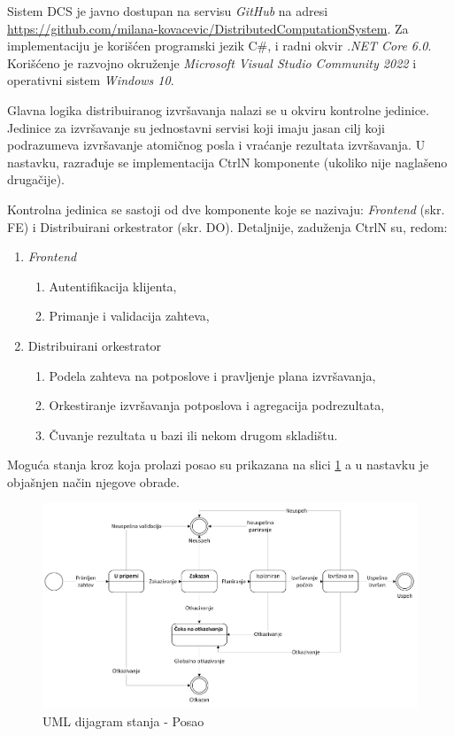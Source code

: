 \documentclass[12pt,oneside]{memoir}
\begin{document}
Sistem DCS je javno dostupan na servisu \emph{GitHub} na adresi \href{https://github.com/milana-kovacevic/DistributedComputationSystem}{https://github.com/milana-kovacevic/DistributedComputationSystem}\label{githubdsc}. Za implementaciju je korišćen programski jezik C\#, i radni okvir \emph{.NET Core 6.0}. Korišćeno je razvojno okruženje \emph{Microsoft Visual Studio Community 2022} i operativni sistem \emph{Windows 10}.

Glavna logika distribuiranog izvršavanja nalazi se u okviru kontrolne jedinice. Jedinice za izvršavanje su jednostavni servisi koji imaju jasan cilj koji podrazumeva izvršavanje atomičnog posla i vraćanje rezultata izvršavanja. U nastavku, razrađuje se implementacija CtrlN komponente (ukoliko nije naglašeno drugačije).

Kontrolna jedinica se sastoji od dve komponente koje se nazivaju: \emph{Frontend} (skr. FE) i Distribuirani orkestrator (skr. DO). Detaljnije, zaduženja CtrlN su, redom:
\begin{enumerate}
\item \emph{Frontend}
	\begin{enumerate}
	\item Autentifikacija klijenta,
	\item Primanje i validacija zahteva,
	\end{enumerate}
\item Distribuirani orkestrator
	\begin{enumerate}
	\item \label{podela_planiranje}Podela zahteva na potposlove i pravljenje plana izvršavanja,
	\item \label{orkestriranje}Orkestiranje izvršavanja potposlova i agregacija podrezultata,
	\item \label{cuvanje_u_bazi}Čuvanje rezultata u bazi ili nekom drugom skladištu.
	\end{enumerate}
\end{enumerate}

Moguća stanja kroz koja prolazi posao su prikazana na slici \ref{fig:stanjaposla} a u nastavku je objašnjen način njegove obrade.

\begin{figure}[!ht]
  \centering
  \includegraphics[width=1.0\textwidth]{./images/dijagram_stanja_posao.png}
  \caption{UML dijagram stanja - Posao}
  \label{fig:stanjaposla}
\end{figure}
\end{document}
